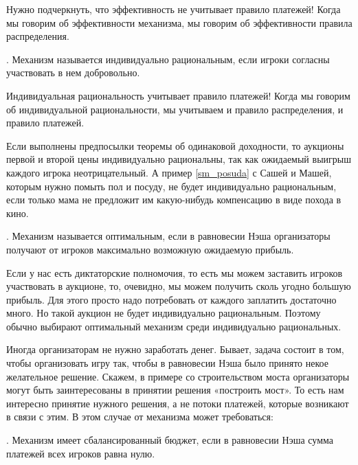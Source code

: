 Нужно подчеркнуть, что эффективность не учитывает правило платежей! Когда мы говорим об эффективности механизма, мы говорим об эффективности правила распределения.

\begin{mydef}
. Механизм называется индивидуально рациональным, если игроки согласны участвовать в нем добровольно.
\end{mydef}

Индивидуальная рациональность учитывает правило платежей! Когда мы говорим об индивидуальной рациональности, мы учитываем и правило распределения, и правило платежей.

\begin{myex} Если выполнены предпосылки теоремы об одинаковой доходности, то аукционы первой и второй цены индивидуально рациональны, так как ожидаемый выигрыш каждого игрока неотрицательный. А пример \ref{sm_posuda} с Сашей и Машей, которым нужно помыть пол и посуду, не будет индивидуально рациональным, если только мама не предложит им какую-нибудь компенсацию в виде похода в кино.
\end{myex}

\begin{mydef} . Механизм называется оптимальным, если в равновесии Нэша организаторы получают от игроков максимально возможную ожидаемую прибыль.
\end{mydef}

Если у нас есть диктаторские полномочия, то есть мы можем заставить игроков участвовать в аукционе, то, очевидно, мы можем получить сколь угодно большую прибыль. Для этого просто надо потребовать от каждого заплатить достаточно много. Но такой аукцион не будет индивидуально рациональным. Поэтому обычно выбирают оптимальный механизм среди индивидуально рациональных.

Иногда организаторам не нужно заработать денег. Бывает, задача состоит в том, чтобы организовать игру так, чтобы в равновесии Нэша было принято некое желательное решение. Скажем, в примере со строительством моста организаторы могут быть заинтересованы в принятии решения «построить мост». То есть нам интересно принятие нужного решения, а не потоки платежей, которые возникают в связи с этим. В этом случае от механизма может требоваться:

\begin{mydef} . Механизм имеет сбалансированный бюджет, если в равновесии Нэша сумма платежей всех игроков равна нулю.
\end{mydef}

